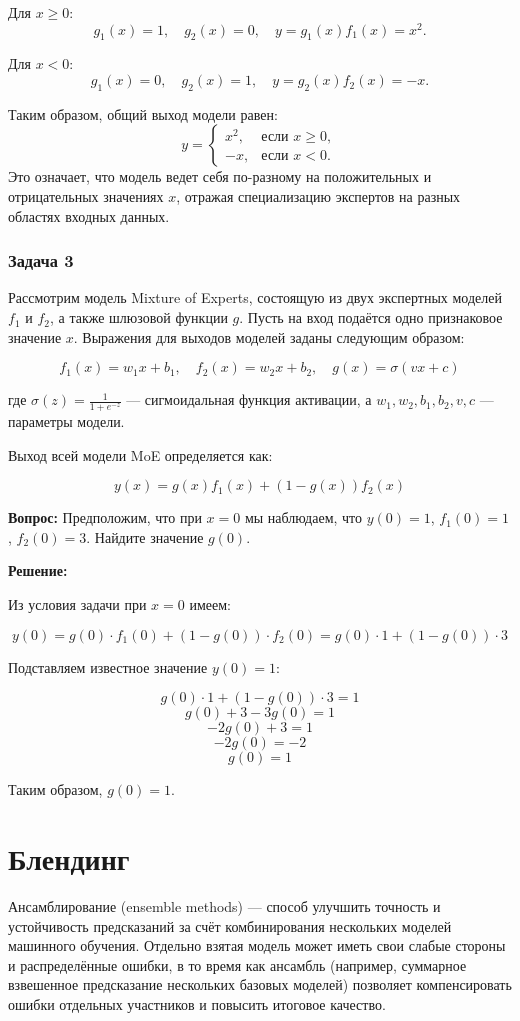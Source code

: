 Для $x \geq 0$:
$$
    g_1(x) = 1, \quad g_2(x) = 0, \quad y = g_1(x) f_1(x) = x^2.
$$

Для $x < 0$:
$$
    g_1(x) = 0, \quad g_2(x) = 1, \quad y = g_2(x) f_2(x) = -x.
$$

Таким образом, общий выход модели равен:
$$
    y =
    \begin{cases}
        x^2, & \text{если } x \geq 0, \\
        -x,  & \text{если } x < 0.
    \end{cases}
$$
Это означает, что модель ведет себя по-разному на положительных и отрицательных значениях $x$, отражая специализацию экспертов на разных областях входных данных.

\subsubsection{Задача 3}

Рассмотрим модель Mixture of Experts, состоящую из двух экспертных моделей $f_1$ и $f_2$, а также шлюзовой функции $g$. Пусть на вход подаётся одно признаковое значение $x$. Выражения для выходов моделей заданы следующим образом:

$$
    f_1(x) = w_1 x + b_1, \quad f_2(x) = w_2 x + b_2, \quad g(x) = \sigma(v x + c)
$$

где $\sigma(z) = \frac{1}{1 + e^{-z}}$ — сигмоидальная функция активации, а $w_1, w_2, b_1, b_2, v, c$ — параметры модели.

Выход всей модели MoE определяется как:

$$
    y(x) = g(x) f_1(x) + (1 - g(x)) f_2(x)
$$

\textbf{Вопрос:} Предположим, что при $x = 0$ мы наблюдаем, что $y(0) = 1$, $f_1(0) = 1$, $f_2(0) = 3$. Найдите значение $g(0)$.

\textbf{Решение:}

Из условия задачи при $x = 0$ имеем:

$$
    y(0) = g(0) \cdot f_1(0) + (1 - g(0)) \cdot f_2(0) = g(0) \cdot 1 + (1 - g(0)) \cdot 3
$$

Подставляем известное значение $y(0) = 1$:

$$
    g(0) \cdot 1 + (1 - g(0)) \cdot 3 = 1
$$
$$
    g(0) + 3 - 3g(0) = 1
$$
$$
    -2g(0) + 3 = 1
$$
$$
    -2g(0) = -2
$$
$$
    g(0) = 1
$$

Таким образом, $g(0) = 1$.

\section{Блендинг}
Ансамблирование (ensemble methods) --- способ улучшить точность и устойчивость предсказаний за счёт комбинирования нескольких моделей машинного обучения. Отдельно взятая модель может иметь свои слабые стороны и распределённые ошибки, в то время как ансамбль (например, суммарное взвешенное предсказание нескольких базовых моделей) позволяет компенсировать ошибки отдельных участников и повысить итоговое качество.

